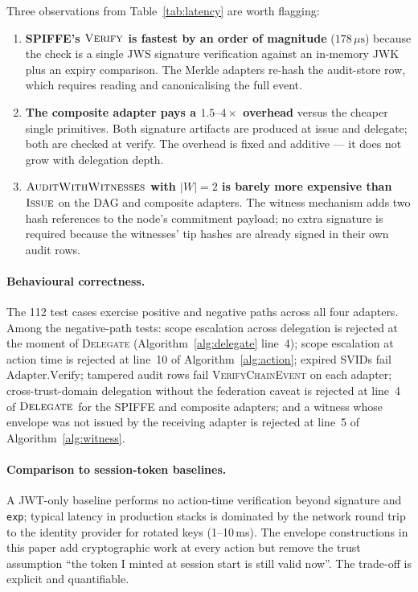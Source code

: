 \documentclass[11pt,a4paper]{article}
\begin{document}
Three observations from Table~\ref{tab:latency} are worth flagging:

\begin{enumerate}[leftmargin=*,nosep]
  \item \textbf{SPIFFE's $\textsc{Verify}$ is fastest by an order of
    magnitude} ($178\,\mu\text{s}$) because the check is a single JWS
    signature verification against an in-memory JWK plus an expiry
    comparison. The Merkle adapters re-hash the audit-store row, which
    requires reading and canonicalising the full event.
  \item \textbf{The composite adapter pays a $1.5\text{--}4\times$
    overhead} versus the cheaper single primitives. Both signature
    artifacts are produced at issue and delegate; both are checked at
    verify. The overhead is fixed and additive --- it does not grow
    with delegation depth.
  \item \textbf{$\textsc{AuditWithWitnesses}$ with $|W|{=}2$ is barely
    more expensive than $\textsc{Issue}$} on the DAG and composite
    adapters. The witness mechanism adds two hash references to the
    node's commitment payload; no extra signature is required because
    the witnesses' tip hashes are already signed in their own audit
    rows.
\end{enumerate}

\paragraph{Behavioural correctness.} The 112 test cases exercise
positive and negative paths across all four adapters. Among the
negative-path tests: scope escalation across delegation is rejected at
the moment of \textsc{Delegate} (Algorithm~\ref{alg:delegate} line~4);
scope escalation at action time is rejected at line~10 of
Algorithm~\ref{alg:action}; expired SVIDs fail
$\mathrm{Adapter.Verify}$; tampered audit rows fail
\textsc{VerifyChainEvent} on each adapter; cross-trust-domain
delegation without the federation caveat is rejected at line~4 of
$\textsc{Delegate}$ for the SPIFFE and composite adapters; and a
witness whose envelope was not issued by the receiving adapter is
rejected at line~5 of Algorithm~\ref{alg:witness}.

\paragraph{Comparison to session-token baselines.} A JWT-only baseline
performs no action-time verification beyond signature and \texttt{exp};
typical latency in production stacks is dominated by the network round
trip to the identity provider for rotated keys (1--10\,ms). The envelope
constructions in this paper add cryptographic work at every action but
remove the trust assumption ``the token I minted at session start is
still valid now''. The trade-off is explicit and quantifiable.
\end{document}
